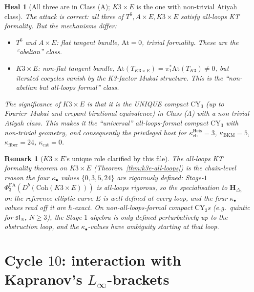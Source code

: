 \documentclass[11pt]{article}
\newtheorem{remark}[theorem]{Remark}
\newtheorem{heal}[theorem]{Heal}
\providecommand{\At}{\mathrm{At}}
\providecommand{\CY}{\mathrm{CY}}
\providecommand{\Coh}{\mathrm{Coh}}
\providecommand{\kBKM}{\kappa_{\mathrm{BKM}}}
\providecommand{\kch}{\kappa_{\mathrm{ch}}}
\providecommand{\kcat}{\kappa_{\mathrm{cat}}}
\providecommand{\kfib}{\kappa_{\mathrm{fiber}}}
\providecommand{\PhiFA}{\Phi^{\mathrm{FA}}}
\begin{document}
\begin{heal}[All three are in Class (A); $K3\times E$ is the one
with non-trivial Atiyah class]
\label{heal:three-class-a}
The attack is correct:  all three of $T^6, A \times E, K3 \times E$
satisfy all-loops KT formality.  But the mechanisms differ:
\begin{itemize}
\item $T^6$ and $A \times E$: flat tangent bundle, $\At = 0$,
trivial formality.  These are the ``abelian'' class.
\item $K3 \times E$: non-flat tangent bundle, $\At(T_{K3\times E})
= \pi_1^* \At(T_{K3}) \neq 0$, but iterated cocycles vanish by the
K3-factor Mukai structure.  This is the ``non-abelian but all-loops
formal'' class.
\end{itemize}

The significance of $K3 \times E$ is that it is the UNIQUE compact
$\CY_3$ (up to Fourier--Mukai and crepant birational equivalence)
in Class (A) with a non-trivial Atiyah class.  This makes it the
``universal'' all-loops-formal compact $\CY_3$ with non-trivial
geometry, and consequently the privileged host for
$\kch^{\mathrm{Heis}} = 3$, $\kBKM = 5$, $\kfib = 24$, $\kcat = 0$.
\end{heal}

\begin{remark}[$K3\times E$'s unique role clarified by this file]
\label{rem:k3e-unique-role}
The all-loops KT formality theorem on $K3 \times E$
(Theorem~\ref{thm:k3e-all-loops}) is the chain-level reason the
four $\kappa_\bullet$ values $\{0, 3, 5, 24\}$ are rigorously
defined: Stage-$1$ $\PhiFA_3(D^b(\Coh(K3\times E)))$ is
all-loops rigorous, so the specialisation to $\mathbf H_{\Delta_5}$
on the reference elliptic curve $E$ is well-defined at every loop,
and the four $\kappa_\bullet$-values read off it are
$\hbar$-exact.  On non-all-loops-formal compact $\CY_3$s (e.g.\
quintic for $\mathfrak{sl}_N$, $N \geq 3$), the Stage-$1$ algebra
is only defined perturbatively up to the obstruction loop, and the
$\kappa_\bullet$-values have ambiguity starting at that loop.
\end{remark}

\section{Cycle $10$:  interaction with Kapranov's $L_\infty$-brackets}
\label{sec:cycle-10-kapranov-interaction}
\end{document}
